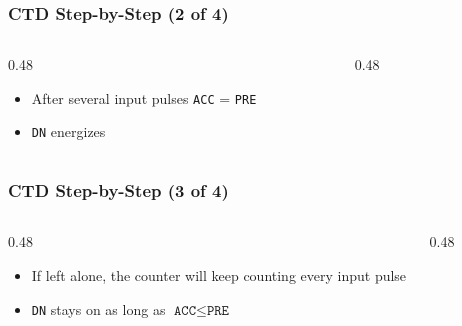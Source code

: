 \begin{frame}
    \frametitle{CTD Step-by-Step (2 of 4)}

    \begin{columns}
        \begin{column}{0.48\linewidth}
            \begin{itemize}
                \item After several input pulses \texttt{ACC} = \texttt{PRE}
                \item \texttt{DN} energizes
            \end{itemize}
        \end{column}
        \begin{column}{0.48\linewidth}
            \begin{figure}
                \centering
                \resizebox{\columnwidth}{!}{
                    
                }
            \end{figure}
        \end{column}
    \end{columns}
\end{frame}

\begin{frame}
    \frametitle{CTD Step-by-Step (3 of 4)}

    \begin{columns}
        \begin{column}{0.48\linewidth}
            \begin{itemize}
                \item If left alone, the counter will keep counting every input pulse
                \item \texttt{DN} stays on as long as $\texttt{ACC} \leq \texttt{PRE}$
            \end{itemize}
        \end{column}
        \begin{column}{0.48\linewidth}
            \begin{figure}
                \centering
                \resizebox{\columnwidth}{!}{
                    
                }
            \end{figure}
        \end{column}
    \end{columns}
\end{frame}

